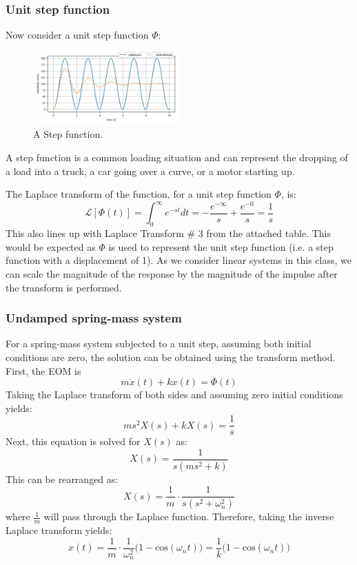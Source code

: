 \documentclass[12pt,letter]{article}
\numberwithin{ex}{section} %
\numberwithin{re}{section} %
\newcommand{\Laplace}[1]{\ensuremath{\mathcal{L}{\left[#1\right]}}}
\begin{document}
\subsubsection{Unit step function}
Now consider a unit step function $\Phi$: 

\begin{figure}[H]
	\centering
	\includegraphics[width=0.5\textwidth]{../Figures/unit_step.png}
	\caption{A Step function. }
\end{figure}

A step function is a common loading situation and can represent the dropping of a load into a truck, a car going over a curve, or a motor starting up. 


The Laplace transform of the function, for a unit step function $\Phi$, is: 
\begin{equation*}
\Laplace{\Phi(t)} = \int_{0}^{\infty} e^{-st}dt = -\frac{e^{-\infty}}{s} +\frac{e^{-0}}{s} =\frac{1}{s}
\end{equation*}
This also lines up with Laplace Transform \# 3 from the attached table. This would be expected as $\Phi$ is used to represent the unit step function (i.e. a step function with a displacement of 1). As we consider linear systems in this class, we can scale the magnitude of the response by the magnitude of the impulse after the transform is performed. 

\subsubsection{Undamped spring-mass system}

For a spring-mass system subjected to a unit step, assuming both initial conditions are zero, the solution can be obtained using the transform method. First, the EOM is 
\begin{equation}
m\ddot{x}(t) + kx(t) = \Phi(t)
\end{equation}
Taking the Laplace transform of both sides and assuming zero initial conditions yields:
\begin{equation}
	ms^2X(s)+kX(s) =\frac{1}{s}
\end{equation}
Next, this equation is solved for $X(s)$ as:
\begin{equation}
	X(s) = \frac{1}{s(ms^2+k)}
\end{equation}
This can be rearranged as:
\begin{equation}
	X(s) = \frac{1}{m} \cdot \frac{1}{s(s^2+\omega_n^2)}
\end{equation}
where $\frac{1}{m}$ will pass through the Laplace function. Therefore, taking the inverse Laplace transform yields:
\begin{equation}
	x(t) = \frac{1}{m} \cdot \frac{1}{\omega_n^2}\big(1-\text{cos}(\omega_n t)\big) = \frac{1}{k}\big(1-\text{cos}(\omega_n t)\big)
\end{equation}
 
\end{document}
